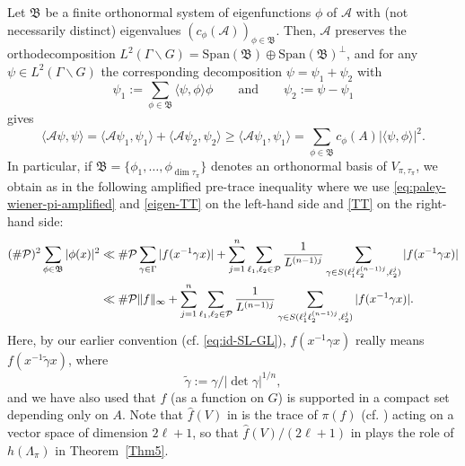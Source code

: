 \documentclass[11pt,oneside]{amsart}
\numberwithin{equation}{section}
\theoremstyle{remark}
\theoremstyle{plain}
\newcommand{\mcA}{\mathcal{A}}
\newcommand{\mcP}{\mathcal{P}}
\newcommand\mfB{\mathfrak{B}}
\newcommand\bs{\backslash}
\renewcommand\geq{\geqslant}
\begin{document}
Let $\mfB$ be a finite orthonormal system of eigenfunctions $\phi$ of $\mcA$ with (not necessarily distinct) eigenvalues $(c_{\phi}(\mcA))_{\phi\in\mfB}$. Then, $\mcA$ preserves the orthodecomposition
$L^2(\Gamma\bs G)=\mathrm{Span}(\mfB)\oplus\mathrm{Span}(\mfB)^{\perp}$,
and for any $\psi\in L^2(\Gamma\bs G)$ the corresponding decomposition $\psi=\psi_1+\psi_2$ with
\[\psi_1:=\sum_{\phi\in\mfB}\langle\psi,\phi\rangle\phi\qquad \text{and} \qquad \psi_2:=\psi-\psi_1\]
gives
$$
\langle \mcA\psi,\psi\rangle=\langle \mcA\psi_1,\psi_1\rangle+\langle \mcA\psi_2,\psi_2\rangle
\geq\langle \mcA\psi_1,\psi_1\rangle=\sum_{\phi\in\mfB}c_{\phi}(A)|\langle\psi,\phi\rangle|^2.
$$
In particular, if $\mfB=\{\phi_1,\dotsc,\phi_{\dim\tau_{\pi}}\}$ denotes an orthonormal basis of $V_{\pi,\tau_{\pi}}$, we obtain as in \cite[(3.12)]{BHMM} the following amplified pre-trace inequality where we use \eqref{eq:paley-wiener-pi-amplified} and \eqref{eigen-TT} on the left-hand side and \eqref{TT} on the right-hand side:
\begin{align}
\notag (\#\mcP)^2 \sum_{\phi \in \mfB} | \phi(x)|^2 & \ll \#\mcP \sum_{\gamma \in \Gamma}| f(x^{-1}\gamma x)|+ \sum_{j=1}^n \sum_{\ell_1 ,\ell_2 \in \mcP} \frac{1}{L^{(n-1)j}} \sum_{\gamma\in S(\ell_1^j \ell_2^{(n-1)j}, \ell_2^j) } |f(x^{-1} \gamma x)| \\
& \label{finalpretrace} \ll \#\mcP \| f \|_{\infty}+ \sum_{j=1}^n \sum_{\ell_1 ,\ell_2 \in \mcP} \frac{1}{L^{(n-1)j}} \sum_{\gamma\in S(\ell_1^j \ell_2^{(n-1)j}, \ell_2^j) } |f(x^{-1} \gamma x)|.
\end{align}
Here, by our earlier convention (cf. \eqref{eq:id-SL-GL}),
$f(x^{-1}\gamma x)$ really means $f(x^{-1}\tilde\gamma x)$, where
\begin{equation}\label{tildegamma}
\tilde\gamma:=\gamma/|\det \gamma|^{1/n},
\end{equation}
and we have also used that $f$ (as a function on $G$) is supported in a compact set depending only on $A$. 
Note that $\hat{f}(V)$ in \cite[(3.12)]{BHMM} is the trace of $\pi(f)$ (cf. \cite[(2.18)]{BHMM}) acting on a vector space of dimension $2\ell + 1$, so that $\hat{f}(V)/(2\ell + 1)$ in \cite[(3.12)]{BHMM} plays the role of $h(\Lambda_{\pi})$ in Theorem~\ref{Thm5}.
\end{document}
